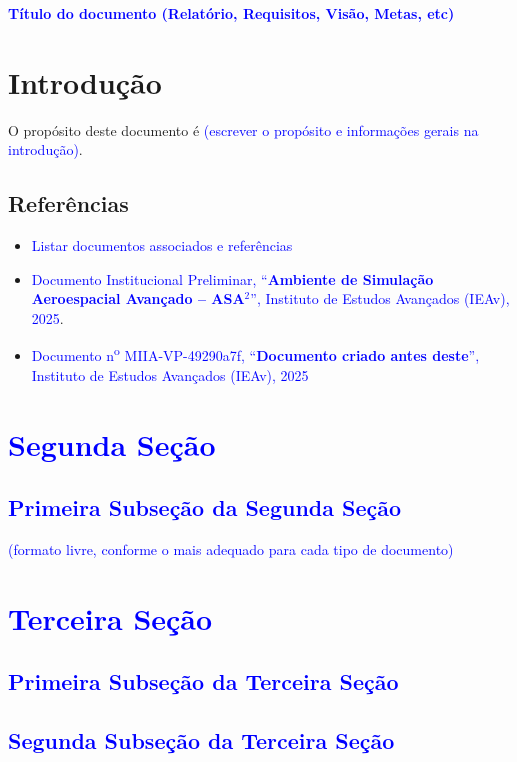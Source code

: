 \begin{center}
    \textbf{\Huge{\textcolor{blue}{Título do documento (Relatório, Requisitos, Visão, Metas, etc)}}}
\end{center}

\section{Introdução}

O propósito deste documento é \textcolor{blue}{(escrever o propósito e informações gerais na introdução)}.

\subsection{Referências}

\begin{itemize}
    \item \textcolor{blue}{Listar documentos associados e referências}
    \item  \textcolor{blue}{Documento Institucional Preliminar, ``\textbf{Ambiente de Simulação Aeroespacial Avançado -- ASA$^{2}$}'', Instituto de Estudos Avançados (IEAv), 2025}.
    \item \textcolor{blue}{Documento n\textsuperscript{o} MIIA-VP-49290a7f, ``\textbf{Documento criado antes deste}'', Instituto de Estudos Avançados (IEAv), 2025}
\end{itemize}

\newpage

\section{\textcolor{blue}{Segunda Seção}}

\subsection{\textcolor{blue}{Primeira Subseção da Segunda Seção}}

\textcolor{blue}{(formato livre, conforme o mais adequado para cada tipo de documento)}

\section{\textcolor{blue}{Terceira Seção}}

\subsection{\textcolor{blue}{Primeira Subseção da Terceira Seção}}

\subsection{\textcolor{blue}{Segunda Subseção da Terceira Seção}}
